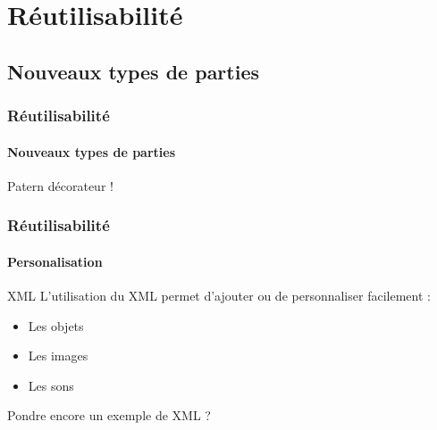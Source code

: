 \section{Réutilisabilité}
\subsection{Nouveaux types de parties}

	\begin{frame}
	\frametitle{Réutilisabilité}
	\framesubtitle{Nouveaux types de parties}
	
		Patern décorateur !
	
	\end{frame}
	
	
	\begin{frame}
	\frametitle{Réutilisabilité}
	\framesubtitle{Personalisation}
	
		\begin{block}{XML}
			L'utilisation du XML permet d'ajouter ou de personnaliser facilement :
			\begin{itemize}
				\item Les objets
				\item Les images
				\item Les sons
			\end{itemize}
		\end{block}
	
		Pondre encore un exemple de XML ?
	
	\end{frame}